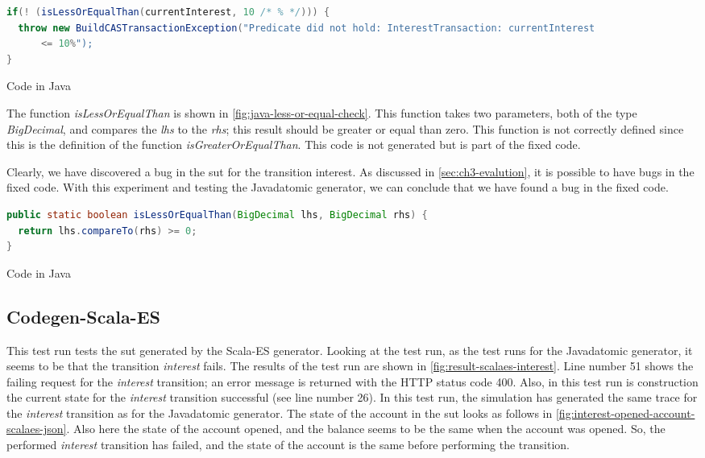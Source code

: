 \begin{sourcecode}[h!]
\begin{lstlisting}[language=Java]
if(! (isLessOrEqualThan(currentInterest, 10 /* % */))) {
  throw new BuildCASTransactionException("Predicate did not hold: InterestTransaction: currentInterest
	  <= 10%");
}
\end{lstlisting}
\caption{Code in Java}\label{fig:java-gen-interest-pre}
\end{sourcecode}
\FloatBarrier

The function \textit{isLessOrEqualThan} is shown in
\autoref{fig:java-less-or-equal-check}. This function takes two parameters, both
of the type \textit{BigDecimal}, and compares the \textit{lhs} to the
\textit{rhs}; this result should be greater or equal than zero. This function
is not correctly defined since this is the definition of the function
\textit{isGreaterOrEqualThan}. This code is not generated but is part of the
fixed code.

Clearly, we have discovered a bug in the \gls{sut} for the transition
interest. As discussed in \autoref{sec:ch3-evalution}, it is possible to have
bugs in the fixed code. With this experiment and testing the Javadatomic
generator, we can conclude that we have found a bug in the fixed code.

\begin{sourcecode}[h!]
\begin{lstlisting}[language=Java]
public static boolean isLessOrEqualThan(BigDecimal lhs, BigDecimal rhs) {
  return lhs.compareTo(rhs) >= 0;
}
\end{lstlisting}
\caption{Code in Java}\label{fig:java-less-or-equal-check}
\end{sourcecode}
\FloatBarrier

\subsection{Codegen-Scala-ES}\label{sec:bug-interest-scalaes}

This test run tests the \gls{sut} generated by the Scala-ES generator. Looking at the
test run, as the test runs for the Javadatomic generator, it seems to be
that the transition \textit{interest} fails. The results of the test run are shown in
\autoref{fig:result-scalaes-interest}. Line number 51 shows the failing request
for the \textit{interest} transition; an error message is returned with the HTTP status
code 400. Also, in this test run is construction the current state for the
\textit{interest} transition successful (see line number 26). In this test run, the
simulation has generated the same trace for the \textit{interest} transition as for the
Javadatomic generator. The state of the account in the \gls{sut} looks as follows in
\autoref{fig:interest-opened-account-scalaes-json}. Also here the state of the
account opened, and the balance seems to be the same when the account was opened.
So, the performed \textit{interest} transition has failed, and the state of the account
is the same before performing the transition.

